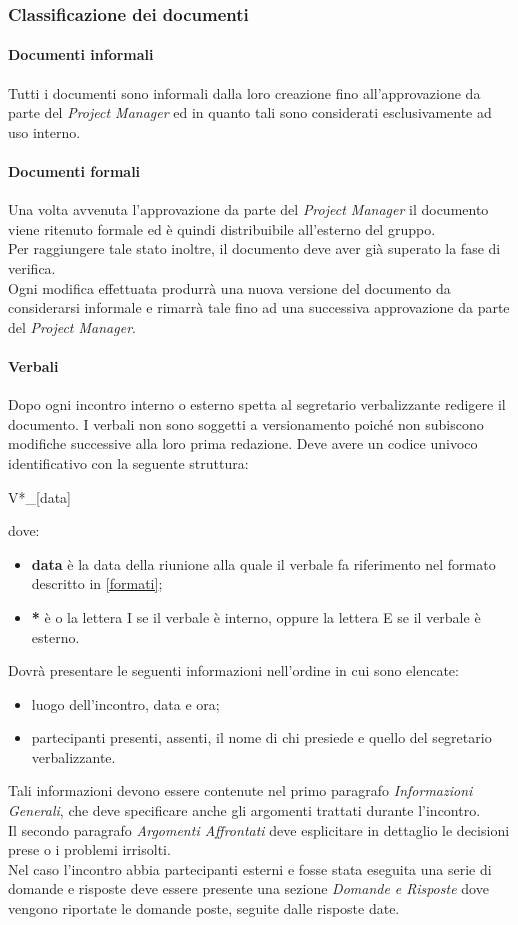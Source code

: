 \subsubsection{Classificazione dei documenti}
\paragraph{Documenti informali}\Spazio
Tutti i documenti sono informali dalla loro creazione fino all'approvazione da parte del \emph{Project Manager} ed in quanto tali sono considerati esclusivamente ad uso interno.
\paragraph{Documenti formali}\Spazio
Una volta avvenuta l'approvazione da parte del \emph{Project Manager} il documento viene ritenuto formale ed è quindi distribuibile all'esterno del gruppo.\\
Per raggiungere tale stato inoltre, il documento deve aver già superato la fase di verifica. \\
Ogni modifica effettuata produrrà una nuova versione del documento da considerarsi informale e rimarrà tale fino ad una successiva approvazione da parte del \emph{Project Manager}.
\paragraph{Verbali}\Spazio
\label{verbali}
Dopo ogni incontro interno o esterno spetta al segretario verbalizzante redigere il documento. I verbali non sono soggetti a versionamento poiché non subiscono modifiche successive alla loro prima redazione. Deve avere un codice univoco identificativo con la seguente struttura:
\newline
\centerline{V*\_[data]}
dove:
\begin{itemize}
	\item \textbf{data} è la data della riunione alla quale il verbale fa riferimento nel formato descritto in \ref{formati};
	\item \textbf{*} è o la lettera I se il verbale è interno, oppure la lettera E se il verbale è esterno.
\end{itemize}
Dovrà presentare le seguenti informazioni nell'ordine in cui sono elencate:
\begin{itemize}
	\item luogo dell'incontro, data e ora;
	\item partecipanti presenti, assenti, il nome di chi presiede e quello del segretario verbalizzante.
\end{itemize}
Tali informazioni devono essere contenute nel primo paragrafo \textit{Informazioni Generali}, che deve specificare anche gli argomenti trattati durante l'incontro.\\
Il secondo paragrafo \textit{Argomenti Affrontati} deve esplicitare in dettaglio le decisioni prese o i problemi irrisolti.\\
Nel caso l'incontro abbia partecipanti esterni e fosse stata eseguita una serie di domande e risposte deve essere presente una sezione  \textit{Domande e Risposte} dove vengono riportate le domande poste, seguite dalle risposte date.
